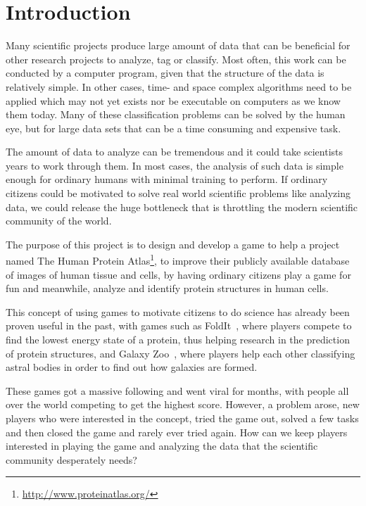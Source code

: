 \section{Introduction}\label{sec:introduction}

Many scientific projects produce large amount of data that can be beneficial for other research projects to analyze, tag or classify. Most often, this work can be conducted by a computer program, given that the structure of the data is relatively simple. In other cases, time- and space complex algorithms need to be applied which may not yet exists nor be executable on computers as we know them today. Many of these classification problems can be solved by the human eye, but for large data sets that can be a time consuming and expensive task.

The amount of data to analyze can be tremendous and it could take scientists years to work through them. In most cases, the analysis of such data is simple enough for ordinary humans with minimal training to perform. If ordinary citizens could be motivated to solve real world scientific problems like analyzing data, we could release the huge bottleneck that is throttling the modern scientific community of the world.


% 
The purpose of this project is to design and develop a game to help a project named The Human Protein Atlas\footnote{\url{http://www.proteinatlas.org/}}, to improve their publicly available database of images of human tissue and cells, by having ordinary citizens play a game for fun and meanwhile, analyze and identify protein structures in human cells.

This concept of using games to motivate citizens to do science has already been proven useful in the past, with games such as FoldIt~\cite{foldit}, where players compete to find the lowest energy state of a protein, thus helping research in the prediction of protein structures, and Galaxy Zoo~\cite{galaxyzoo}, where players help each other classifying astral bodies in order to find out how galaxies are formed.

These games got a massive following and went viral for months, with people all over the world competing to get the highest score. However, a problem arose, new players who were interested in the concept, tried the game out, solved a few tasks and then closed the game and rarely ever tried again. How can we keep players interested in playing the game and analyzing the data that the scientific community desperately needs?

